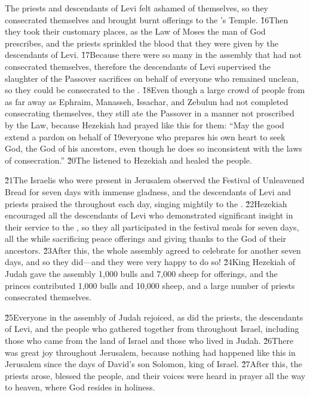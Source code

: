 The priests and descendants of Levi felt ashamed of themselves, so they consecrated themselves and brought burnt offerings to the 's Temple. \v{16}Then they took their customary places, as the Law of Moses the man of God prescribes, and the priests sprinkled the blood that they were given by the descendants of Levi. \v{17}Because there were so many in the assembly that had not consecrated themselves, therefore the descendants of Levi supervised the slaughter of the Passover sacrifices on behalf of everyone who remained unclean, so they could be consecrated to the . \v{18}Even though a large crowd of people from as far away as Ephraim, Manasseh, Issachar, and Zebulun had not completed consecrating themselves, they still ate the Passover in a manner not proscribed by the Law, because Hezekiah had prayed like this for them: ``May the good  extend a pardon on behalf of \v{19}everyone who prepares his own heart to seek God, the  God of his ancestors, even though he does so inconsistent with the laws of consecration.'' \v{20}The  listened to Hezekiah and healed the people.

\v{21}The Israelis who were present in Jerusalem observed the Festival of Unleavened Bread for seven days with immense gladness, and the descendants of Levi and priests praised the  throughout each day, singing mightily to the . \v{22}Hezekiah encouraged all the descendants of Levi who demonstrated significant insight in their service to the , so they all participated in the festival meals for seven days, all the while sacrificing peace offerings and giving thanks to the  God of their ancestors. \v{23}After this, the whole assembly agreed to celebrate for another seven days, and so they did---and they were very happy to do so! \v{24}King Hezekiah of Judah gave the assembly 1,000 bulls and 7,000 sheep for offerings, and the princes contributed 1,000 bulls and 10,000 sheep, and a large number of priests consecrated themselves.

\v{25}Everyone in the assembly of Judah rejoiced, as did the priests, the descendants of Levi, and the people who gathered together from throughout Israel, including those who came from the land of Israel and those who lived in Judah. \v{26}There was great joy throughout Jerusalem, because nothing had happened like this in Jerusalem since the days of David's son Solomon, king of Israel. \v{27}After this, the priests arose, blessed the people, and their voices were heard in prayer all the way to heaven, where God resides in holiness.

